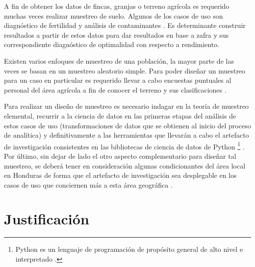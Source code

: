 \documentclass{report}
\begin{document}
\bigbreak

A fin de obtener los datos de fincas, granjas o terreno agrícola es requerido muchas veces realizar muestreo de suelo. Algunos de los casos de uso son diagnóstico de fertilidad \cite{lassaga-2011} y análisis de contaminantes \cite{gobpe-ministerio-del-ambiente-2014}. Es determinante construir resultados a partir de estos datos para dar resultados en base a zafra y sus correspondiente diagnóstico de optimalidad con respecto a rendimiento.

\bigbreak

Existen varios enfoques de muestreo de una población, la mayor parte de las veces se basan en un muestreo aleatorio simple. Para poder diseñar un muestreo para un caso en particular es requerido llevar a cabo encuestas puntuales al personal del área agrícola a fin de conocer el terreno y sus clasificaciones \cite{organizacion-de-las-naciones-unidas-para-la-agricultura-y-la-alimentacion-1990}.

\bigbreak

Para realizar un diseño de muestreo es necesario indagar en la teoría de muestreo elemental, recurrir a la ciencia de datos en las primeras etapas del análisis de estos casos de uso (transformaciones de datos que se obtienen al inicio del proceso de analítica) y definitivamente a las herramientas que llevarán a cabo el artefacto de investigación consistentes en las bibliotecas de ciencia de datos de Python \footnote{Python es un lenguaje de programación de propósito general de alto nivel e interpretado \cite{wikipedia-python-2021}.} \cite{grus-2015} \cite{geopandas-developers-2021}. Por último, sin dejar de lado el otro aspecto complementario para diseñar tal muestreo, se deberá tener en consideración algunas condicionantes del área local en Honduras de forma que el artefacto de investigación sea desplegable en los casos de uso que conciernen más a esta área geográfica \cite{fao-2004}.

\section{Justificación}
\end{document}
